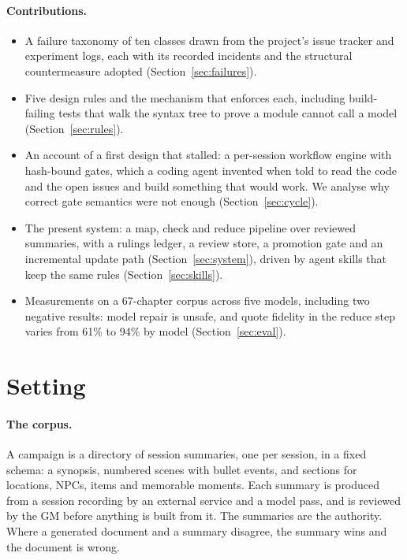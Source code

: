 \documentclass[11pt]{article}
\begin{document}
\paragraph{Contributions.}
\begin{itemize}[nosep]
\item A failure taxonomy of ten classes drawn from the project's issue tracker and
experiment logs, each with its recorded incidents and the structural countermeasure
adopted (Section~\ref{sec:failures}).
\item Five design rules and the mechanism that enforces each, including build-failing
tests that walk the syntax tree to prove a module cannot call a model
(Section~\ref{sec:rules}).
\item An account of a first design that stalled: a per-session workflow engine with
hash-bound gates, which a coding agent invented when told to read the code and the open
issues and build something that would work. We analyse why correct gate semantics were
not enough
(Section~\ref{sec:cycle}).
\item The present system: a map, check and reduce pipeline over reviewed summaries, with
a rulings ledger, a review store, a promotion gate and an incremental update path
(Section~\ref{sec:system}), driven by agent skills that keep the same rules
(Section~\ref{sec:skills}).
\item Measurements on a 67-chapter corpus across five models, including two negative
results: model repair is unsafe, and quote fidelity in the reduce step varies from 61\%
to 94\% by model (Section~\ref{sec:eval}).
\end{itemize}

\section{Setting}
\label{sec:setting}

\paragraph{The corpus.} A campaign is a directory of session summaries, one per session,
in a fixed schema: a synopsis, numbered scenes with bullet events, and sections for
locations, NPCs, items and memorable moments. Each summary is produced from a session
recording by an external service and a model pass, and is reviewed by the GM before
anything is built from it. The summaries are the authority. Where a generated document
and a summary disagree, the summary wins and the document is wrong.
\end{document}

